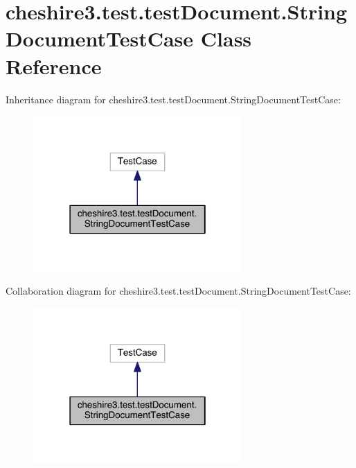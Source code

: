\hypertarget{classcheshire3_1_1test_1_1test_document_1_1_string_document_test_case}{\section{cheshire3.\-test.\-test\-Document.\-String\-Document\-Test\-Case Class Reference}
\label{classcheshire3_1_1test_1_1test_document_1_1_string_document_test_case}
}


Inheritance diagram for cheshire3.\-test.\-test\-Document.\-String\-Document\-Test\-Case\-:
\nopagebreak
\begin{figure}[H]
\begin{center}
\leavevmode
\includegraphics[width=226pt]{classcheshire3_1_1test_1_1test_document_1_1_string_document_test_case__inherit__graph}
\end{center}
\end{figure}


Collaboration diagram for cheshire3.\-test.\-test\-Document.\-String\-Document\-Test\-Case\-:
\nopagebreak
\begin{figure}[H]
\begin{center}
\leavevmode
\includegraphics[width=226pt]{classcheshire3_1_1test_1_1test_document_1_1_string_document_test_case__coll__graph}
\end{center}
\end{figure}
